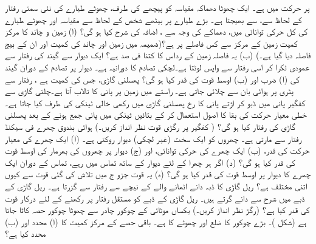  پر حرکت میں ہے۔ ایک چھوٹا دھماکہ  مقیاسہ کو  پیچھے کی طرف، چھوٹے طیارے کی نئی سمتی رفتار کے لحاظ سے،  سے بھیجتا ہے۔ بڑے طیارے پر بیٹھے شخص  کے لحاظ سے مقیاسہ اور چھوٹے طیارے کی کل حرکی توانائی میں،  دھماکے کی وجہ سے    ، اضافہ کی شرح کیا   ہو گی؟
(ا) زمین و چاند کا مرکز کمیت زمین کے مرکز سے کس فاصلے پر ہے؟(ضمیمہ  میں زمین اور چاند کی کمیت اور ان کے بیچ فاصلہ دیا گیا ہے۔) (ب)  یہ فاصلہ زمین کے رداس کا کتنا فی صد ہے؟
ایک دیوار سے  گیند  کی رفتار سے عمودی  ٹکرا کر اسی رفتار سے واپس لوٹتا ہے۔لچکی  تصادم کا دورانیہ  ہے۔ دیوار پر تصادم کے دوران گیند کی (ا)  ضرب اور (ب) اوسط قوت  کی قدر کیا ہو گی؟
پھسلنی گاڑی،   جس کی کمیت  ہے ،  رفتار سے   پٹری پر ہوائی بان سے چلائی جاتی ہے۔ راستے میں  زمین  پر  پانی  کا تالاب آتا ہے۔چلتی  گاڑی سے  کفگیر   پانی میں  ڈبو کر   اڑتے پانی کا رخ پھسلنی گاڑی میں رکھی  خالی ٹینکی کی طرف   کیا جاتا ہے۔ خطی معیار حرکت کی بقا کا اصول استعمال کر کے بتائیں  ٹینکی  میں پانی جمع  ہونے کے بعد پھسلنی گاڑی کی رفتار کیا ہو گی؟ ( کفگیر پر رگڑی قوت نظر انداز کریں۔)
ہوائی بندوق  چھرے فی سیکنڈ   رفتار سے مارتی ہے۔ چھروں کو   ایک سخت (غیر لچکی)  دیوار روکتی ہے۔ (ا)  ایک چھرے کی معیار حرکت کی قدر، (ب) ایک چھرے کی حرکی توانائی، اور (ج) دیوار پر چھروں کی بھرمار کی اوسط قوت کی قدر کیا ہو گی؟ (د) اگر ہر چھرا  کے لئے دیوار کے ساتھ تماس میں رہے، تماس کے دوران ایک چھرے کا دیوار پر اوسط قوت کی قدر کیا ہو گی؟ (ہ)  یہ قوت جزو ج میں تلاش کی گئی قوت سے کیوں اتنی مختلف ہے؟
 ریل گاڑی کا ڈبہ  دانے اٹھانے والے   کے نیچے سے  رفتار سے گزرتا ہے۔  ریل گاڑی کے ڈبے میں  شرح سے دانے گرتے ہیں۔ ریل گاڑی کے ڈبے کو مستقل رفتار پر رکھنے کے لئے درکار قوت کی قدر کیا  ہے؟ (رگڑ نظر انداز کریں۔)
یکساں موٹائی کے چوکور چادر سے  چھوٹا چوکور حصہ کاٹا جاتا ہے (شکل )۔ بڑے چوکور کا ضلع  اور چھوٹے کا  ہے۔ باقی حصے کے مرکز کمیت کا (ا)  محدد اور (ب)  محدد کیا ہے؟
